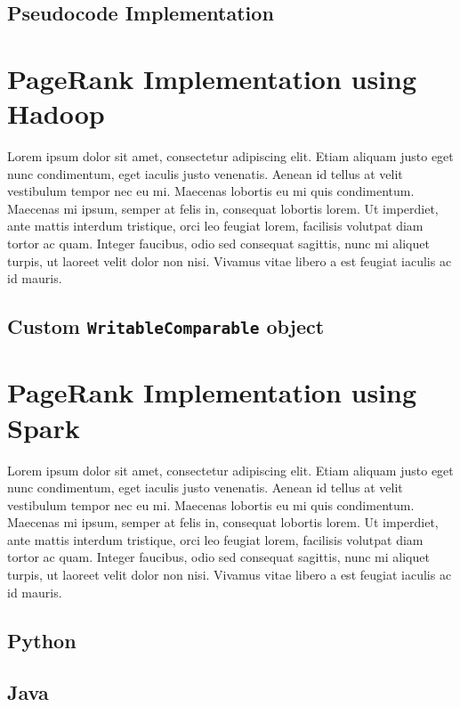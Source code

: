 \documentclass[11pt,a4paper]{article}
\begin{document}
\subsection{Pseudocode Implementation}
\section{PageRank Implementation using Hadoop}
Lorem ipsum dolor sit amet, consectetur adipiscing elit. Etiam aliquam justo eget nunc condimentum, eget iaculis justo venenatis. Aenean id tellus at velit vestibulum tempor nec eu mi. Maecenas lobortis eu mi quis condimentum. Maecenas mi ipsum, semper at felis in, consequat lobortis lorem. Ut imperdiet, ante mattis interdum tristique, orci leo feugiat lorem, facilisis volutpat diam tortor ac quam. Integer faucibus, odio sed consequat sagittis, nunc mi aliquet turpis, ut laoreet velit dolor non nisi. Vivamus vitae libero a est feugiat iaculis ac id mauris.
\subsection{Custom \texttt{WritableComparable} object}
\section{PageRank Implementation using Spark}
Lorem ipsum dolor sit amet, consectetur adipiscing elit. Etiam aliquam justo eget nunc condimentum, eget iaculis justo venenatis. Aenean id tellus at velit vestibulum tempor nec eu mi. Maecenas lobortis eu mi quis condimentum. Maecenas mi ipsum, semper at felis in, consequat lobortis lorem. Ut imperdiet, ante mattis interdum tristique, orci leo feugiat lorem, facilisis volutpat diam tortor ac quam. Integer faucibus, odio sed consequat sagittis, nunc mi aliquet turpis, ut laoreet velit dolor non nisi. Vivamus vitae libero a est feugiat iaculis ac id mauris.
\subsection{Python}
\subsection{Java}
\end{document}
